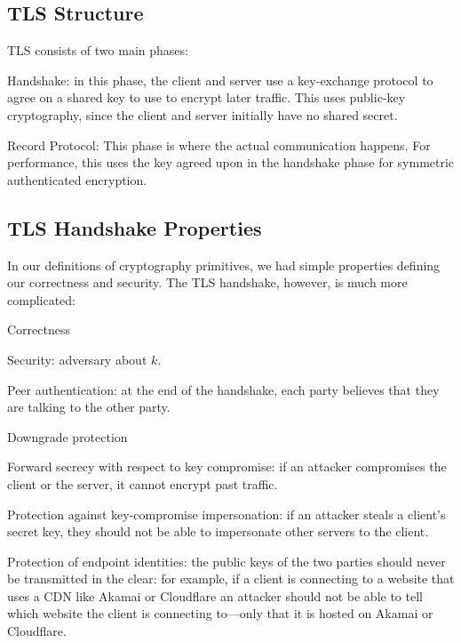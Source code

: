 \subsection{TLS Structure}
TLS consists of two main phases:
\begin{compactenum}
\item Handshake: in this phase, the client and server use a key-exchange protocol to agree on a shared key to use to encrypt later traffic. This uses public-key cryptography, since the client and server initially have no shared secret.
\item Record Protocol: This phase is where the actual communication happens. For performance, this uses the key agreed upon in the handshake phase for symmetric authenticated encryption.
\end{compactenum}

\subsection{TLS Handshake Properties}
In our definitions of cryptography primitives, we had simple properties defining our correctness and security. The TLS handshake, however, is much more complicated:

\begin{compactitem}
	\item Correctness
	\item Security: adversary  about $k$.
	\item Peer authentication: at the end of the handshake, each party believes that they are talking to the other party.
	\item Downgrade protection
	\item Forward secrecy with respect to key compromise: if an attacker compromises the client or the server, it cannot encrypt past traffic. 
	\item Protection against key-compromise impersonation: if an attacker steals a client's secret key, they should not be able to impersonate other servers to the client.
	\item Protection of endpoint identities: the public keys of the two parties should never be transmitted in the clear: for example, if a client is connecting to a website that uses a CDN like Akamai or Cloudflare an attacker should not be able to tell which website the client is connecting to---only that it is hosted on Akamai or Cloudflare.
\end{compactitem}

